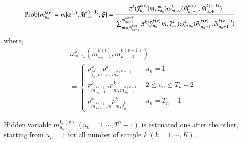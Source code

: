 \documentclass[a4paper,oneside,onecolumn,preprint,10pt,authoryear]{elsarticle}
\begin{document}
\begin{eqnarray}
&& \hspace{-1mm}\mbox{Prob}\{m_{u_n}^{k(v)}=m|\mbox{\boldmath$\alpha$}^{(v)},\tilde{\mbox{\boldmath$m$}}_{-u_n}^{k(v-1)},
\bar{\mbox{\boldmath$\xi$}}\} =\frac{
\pi^k(\bar{y}_{u_n}^{k(v)}|m,\bar{z}_{u_n}^k) \omega_{m,u_n}^k(\tilde{m}_{u_{n}-1}^{k(v)},\tilde{m}_{u_{n}+1}^{k(v-1)}) }{
\sum_{m=\tilde{m}_{u_n-1}^{k(v)}}^{\tilde{m}_{u_n+1}^{k(v-1)}} \pi^k(\bar{y}_{u_n}^{k(v)}|m,\bar{z}_{u_n}^k) \omega_{m,u_n}^k(\tilde{m}_{u_{n}-1}^{k(v)},\tilde{m}_{u_{n}+1}^{k(v-1)}) }  \label{hhu1}
\end{eqnarray}
where, 
\begin{eqnarray}
&& \omega_{m,u_n}^k(\tilde{m}_{u_{n}-1}^{k(v)},\tilde{m}_{u_{n}+1}^{k(v-1)}) \nonumber \\
&& =\left\{
\begin{array}{ll}
p^k_{\bar{j}_n^k,m}p^k_{m,\tilde{m}_2^{k(v-1)}} & u_n=1 \\
p^k_{\tilde{m}_{u_{n}-1}^{k(v),m}} p^k_{m,\tilde{m}_{u_{n}+1}^{k(v-1)} }& 2\leq u_n \leq T_n-2 \\
p^k_{\tilde{m}_{T_n-2}^{k(v)},m}p^k_{m,\bar{j}_{n}^k} & u_n=T_n-1
\end{array}
\right.
\end{eqnarray}

Hidden variable $m_{u_n}^{k,(v)}~(u_n=1,\cdots,T^n-1)$ is estimated one after the other,  starting from $u_n=1$ for all number of sample $k~(k=1,\cdots,K)$.
\end{document}
